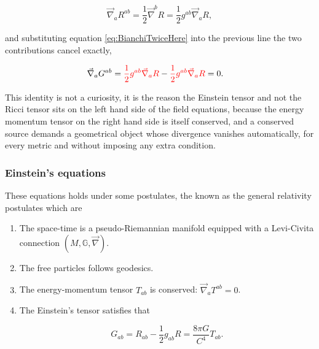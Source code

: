             \begin{equation}\label{eq:BianchiTwiceHere}
                \Vec{\nabla}_aR^{ab} = \frac{1}{2}\Vec{\nabla}^bR = \frac{1}{2}g^{ab}\Vec{\nabla}_aR,
            \end{equation}

            and substituting equation \ref{eq:BianchiTwiceHere} into the previous line the two contributions cancel exactly,

            \begin{align*}
                \Vec{\nabla}_aG^{ab} &= {\color{red}\frac{1}{2}g^{ab}\Vec{\nabla}_aR} - {\color{red}\frac{1}{2}g^{ab}\Vec{\nabla}_aR} = 0.
            \end{align*}

            This identity is not a curiosity, it is the reason the Einstein tensor and not the Ricci tensor sits on the left hand side of the field equations, because the energy momentum tensor on the right hand side is itself conserved, and a conserved source demands a geometrical object whose divergence vanishes automatically, for every metric and without imposing any extra condition.

        \subsubsection{Einstein's equations}

            These equations holds under some postulates, the known as the general relativity postulates which are

            \begin{enumerate}
                \item The space-time is a pseudo-Riemannian manifold equipped with a Levi-Civita connection $(M,\mathbb{G},\Vec{\nabla})$.

                \item The free particles follows geodesics.

                \item The energy-momentum tensor $T_{ab}$ is conserved: $\Vec{\nabla}_aT^{ab}=0$.

                \item The Einstein's tensor satisfies  that

                \begin{equation}
                    G_{ab}=R_{ab}-\frac{1}{2}g_{ab}R = \frac{8\pi G}{C^4}T_{ab}.
                \end{equation}
            \end{enumerate}

